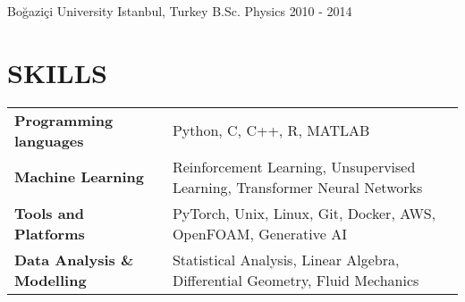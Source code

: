 \documentclass[letterpaper,11pt]{article}
\begin{document}
\vspace{-4pt}

\resumeSubheading
{Boğaziçi University}
{Istanbul, Turkey}
{B.Sc. Physics}
{2010 - 2014}
\resumeItemListStart
{}
\resumeItemListEnd

\resumeSubHeadingListEnd
\vspace{-10pt}
\section{SKILLS}

\begin{multicols}{2}
  \begin{tabular}{ p{5.4cm} p{14.3cm}}
    \textbf{Programming languages}    & Python, C, C++, R, MATLAB \\
    \textbf{Machine Learning}         & Reinforcement Learning,
    Unsupervised Learning, Transformer Neural Networks \\
    \textbf{Tools and Platforms}         & PyTorch, Unix, Linux, Git,
    Docker, AWS, OpenFOAM, Generative AI \\
    \textbf{Data Analysis \& Modelling}         & Statistical
    Analysis, Linear Algebra, Differential Geometry, Fluid Mechanics \\
  \end{tabular}
\end{multicols}

%
\printbibliography[title = PUBLICATIONS]
\vspace{-8pt}
\end{document}
